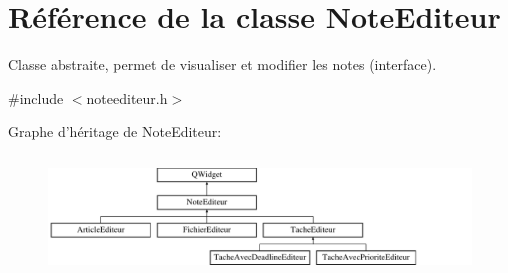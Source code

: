 \hypertarget{class_note_editeur}{\section{Référence de la classe Note\-Editeur}
\label{class_note_editeur}
}


Classe abstraite, permet de visualiser et modifier les notes (interface).  




{\ttfamily \#include $<$noteediteur.\-h$>$}

Graphe d'héritage de Note\-Editeur\-:\begin{figure}[H]
\begin{center}
\leavevmode
\includegraphics[height=3.200000cm]{class_note_editeur}
\end{center}
\end{figure}
